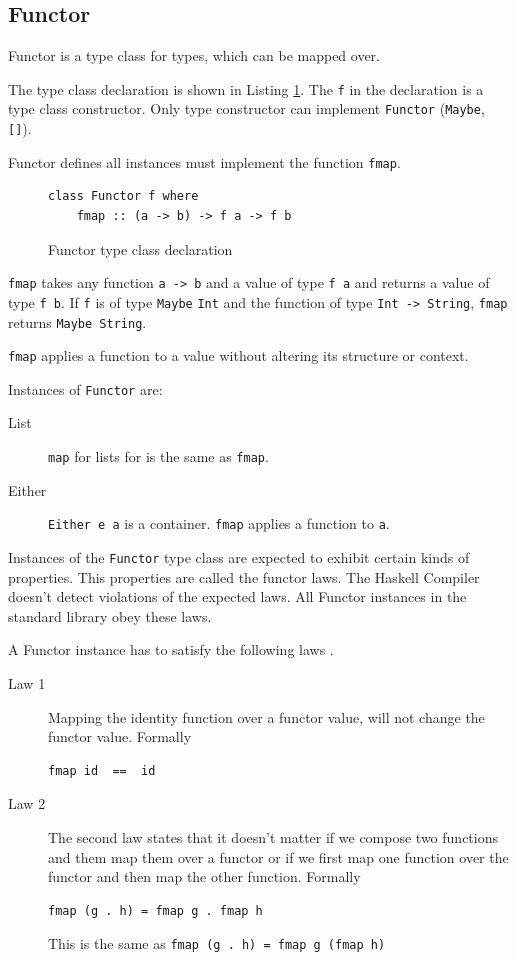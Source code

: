 \documentclass[twoside, a4paper]{article}
\begin{document}
\subsection{Functor}
\label{sec:functor}

Functor is a type class for types, which can be mapped over. 

The type class declaration is shown in Listing \ref{fig:functordeclaration}.
The \verb|f| in the declaration is a type class constructor. Only type constructor can implement \verb|Functor| (\verb|Maybe|, \verb|[]|).

Functor defines all instances must implement the function \verb|fmap|.
\begin{figure}
  \centering
\begin{verbatim}
class Functor f where
    fmap :: (a -> b) -> f a -> f b
\end{verbatim}
  \caption{Functor type class declaration}
  \label{fig:functordeclaration}
\end{figure}

\verb|fmap| takes any function \verb|a -> b| and a value of type \verb|f a| and returns a value of type \verb|f b|. 
If \verb|f| is of type \verb|Maybe| \verb|Int| and the function of type \verb|Int -> String|, \verb|fmap| returns \verb|Maybe String|. 

\verb|fmap| applies a function to a value without altering its structure or context.

Instances of \verb|Functor| are:

\begin{description}
\item[List] \verb|map| for lists for is the same as \verb|fmap|.
\item[Either] \verb|Either e a| is a container. \verb|fmap| applies a function to \verb|a|.
\end{description}

Instances of the \verb|Functor| type class are expected to exhibit certain kinds of properties. This properties are called the functor laws.
The Haskell Compiler doesn't detect violations of the expected laws. All Functor instances in the standard library obey these laws.

A Functor instance has to satisfy the following laws \cite{Marlow_2010}.

\begin{description}
\item[Law 1] Mapping the identity function over a functor value, will not change the functor value. Formally
\begin{verbatim}
fmap id  ==  id
\end{verbatim}
\item[Law 2] The second law states that it doesn't matter if we compose two functions and them map them over a functor or if we first map one function over the functor and then map the other function. Formally
\begin{verbatim}
fmap (g . h) = fmap g . fmap h
\end{verbatim}
This is the same as \verb|fmap (g . h) = fmap g (fmap h)|
\end{description}
\end{document}
